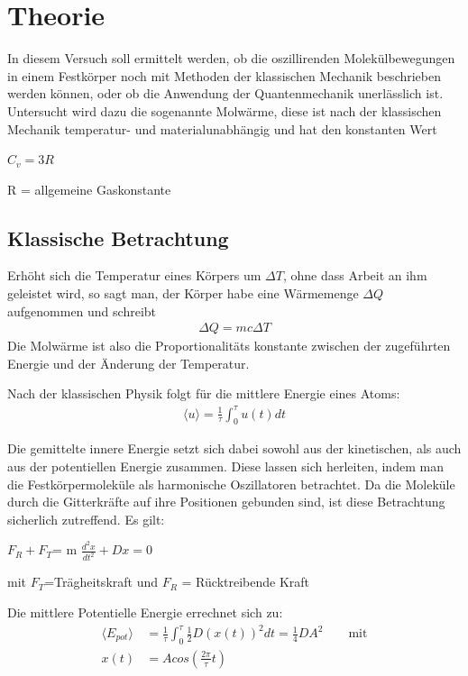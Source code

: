 
\section{Theorie}
In diesem Versuch soll ermittelt werden, ob die oszillirenden Molekülbewegungen in einem Festkörper noch mit Methoden der klassischen Mechanik beschrieben werden können, oder ob die Anwendung der Quantenmechanik unerlässlich ist. Untersucht wird dazu die sogenannte Molwärme, diese ist nach der klassischen Mechanik temperatur- und materialunabhängig und hat den konstanten Wert
\begin{formel}[H]
\centering
$C_v=3R$
\caption*{\small{R = allgemeine Gaskonstante}}
\end{formel}

\subsection{Klassische Betrachtung}
Erhöht sich die Temperatur eines Körpers um $\Delta T$, ohne dass Arbeit an ihm geleistet wird, so sagt man, der Körper habe eine Wärmemenge $\Delta Q$ aufgenommen und schreibt
\begin{align}
\Delta Q = mc \Delta T
\end{align}
Die Molwärme ist also die Proportionalitäts konstante zwischen der zugeführten Energie und der Änderung der Temperatur.

Nach der klassischen Physik folgt für die mittlere Energie eines Atoms:
\begin{align*}
\langle u\rangle = \frac{1}{\tau} \int^\tau_0 u(t) dt
\end{align*}

Die gemittelte innere Energie setzt sich dabei sowohl aus der kinetischen, als auch aus der potentiellen Energie zusammen.
Diese lassen sich herleiten, indem man die Festkörpermoleküle als harmonische Oszillatoren betrachtet. Da die Moleküle durch die Gitterkräfte auf ihre Positionen gebunden sind, ist diese Betrachtung sicherlich zutreffend. Es gilt:
\begin{formel}[H]
\centering
$F_R + F_T $= m $\frac{d^2x}{dt^2} + Dx  = 0$
\caption*{\small{mit
$F_T$=Trägheitskraft und $F_R$ = Rücktreibende Kraft}}
\end{formel}

Die mittlere Potentielle Energie errechnet sich zu:
\begin{align*}
\langle E_{pot}\rangle &= \frac{1}{\tau} \int^\tau_0 \frac{1}{2} D \left( x(t) \right)^2 dt =  \frac{1}{4} D A^2 \qquad \text{mit}\\
x(t)&=Acos\left(\frac{2\pi}{\tau}t\right)
\end{align*}

